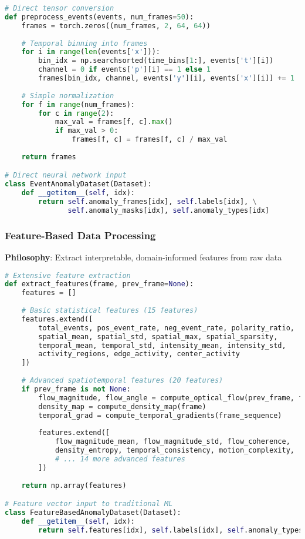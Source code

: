 \documentclass[11pt,a4paper]{article}
\begin{document}
\begin{lstlisting}[language=Python, caption=Architecture-Based Data Flow]
# Direct tensor conversion
def preprocess_events(events, num_frames=50):
    frames = torch.zeros((num_frames, 2, 64, 64))
    
    # Temporal binning into frames
    for i in range(len(events['x'])):
        bin_idx = np.searchsorted(time_bins[1:], events['t'][i])
        channel = 0 if events['p'][i] == 1 else 1
        frames[bin_idx, channel, events['y'][i], events['x'][i]] += 1
    
    # Simple normalization
    for f in range(num_frames):
        for c in range(2):
            max_val = frames[f, c].max()
            if max_val > 0:
                frames[f, c] = frames[f, c] / max_val
    
    return frames

# Direct neural network input
class EventAnomalyDataset(Dataset):
    def __getitem__(self, idx):
        return self.anomaly_frames[idx], self.labels[idx], \
               self.anomaly_masks[idx], self.anomaly_types[idx]
\end{lstlisting}

\subsubsection{Feature-Based Data Processing}
\textbf{Philosophy}: Extract interpretable, domain-informed features from raw data

\begin{lstlisting}[language=Python, caption=Feature-Based Data Flow]
# Extensive feature extraction
def extract_features(frame, prev_frame=None):
    features = []
    
    # Basic statistical features (15 features)
    features.extend([
        total_events, pos_event_rate, neg_event_rate, polarity_ratio,
        spatial_mean, spatial_std, spatial_max, spatial_sparsity,
        temporal_mean, temporal_std, intensity_mean, intensity_std,
        activity_regions, edge_activity, center_activity
    ])
    
    # Advanced spatiotemporal features (20 features)
    if prev_frame is not None:
        flow_magnitude, flow_angle = compute_optical_flow(prev_frame, frame)
        density_map = compute_density_map(frame)
        temporal_grad = compute_temporal_gradients(frame_sequence)
        
        features.extend([
            flow_magnitude_mean, flow_magnitude_std, flow_coherence,
            density_entropy, temporal_consistency, motion_complexity,
            # ... 14 more advanced features
        ])
    
    return np.array(features)

# Feature vector input to traditional ML
class FeatureBasedAnomalyDataset(Dataset):
    def __getitem__(self, idx):
        return self.features[idx], self.labels[idx], self.anomaly_types[idx]
\end{lstlisting}
\end{document}
